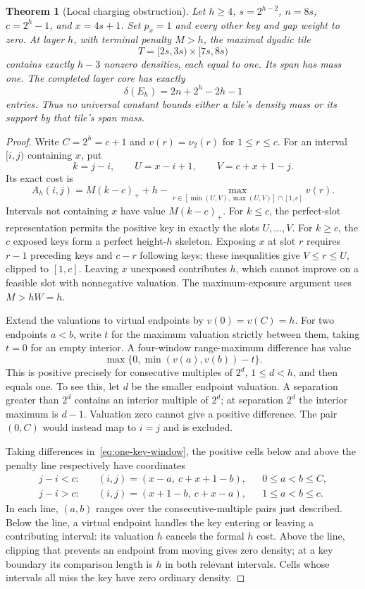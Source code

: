 \documentclass[11pt]{article}
\newtheorem{theorem}{Theorem}
\begin{document}
\begin{theorem}[Local charging obstruction]\label{thm:local-tile-obstruction}
Let $h\ge4$, $s=2^{h-2}$, $n=8s$, $c=2^h-1$, and $x=4s+1$.
Set $p_x=1$ and every other key and gap weight to zero. At layer $h$,
with terminal penalty $M>h$, the maximal dyadic tile
\[
 T=[2s,3s)\times[7s,8s)
\]
contains exactly $h-3$ nonzero densities, each equal to one. Its span
has mass one. The completed layer core has exactly
\[
 \delta(E_h)=2n+2^h-2h-1
\]
entries. Thus no universal constant bounds either a tile's density mass
or its support by that tile's span mass.
\end{theorem}
\begin{proof}
Write $C=2^h=c+1$ and $v(r)=\nu_2(r)$ for $1\le r\le c$.
For an interval $[i,j)$ containing $x$, put
\[
 k=j-i,\qquad U=x-i+1,\qquad V=c+x+1-j.
\]
Its exact cost is
\begin{equation}\label{eq:one-key-window}
 A_h(i,j)=M(k-c)_++h-
 \max_{r\in[\min(U,V),\max(U,V)]\cap[1,c]}v(r).
\end{equation}
Intervals not containing $x$ have value $M(k-c)_+$.
For $k\le c$, the perfect-slot representation permits the positive key
in exactly the slots $U,\ldots,V$. For $k\ge c$, the $c$ exposed keys
form a perfect height-$h$ skeleton. Exposing $x$ at slot $r$ requires
$r-1$ preceding keys and $c-r$ following keys; these inequalities give
$V\le r\le U$, clipped to $[1,c]$. Leaving $x$ unexposed contributes
$h$, which cannot improve on a feasible slot with nonnegative valuation.
The maximum-exposure argument uses $M>hW=h$.

Extend the valuations to virtual endpoints by $v(0)=v(C)=h$.
For two endpoints $a<b$, write $t$ for the maximum valuation strictly
between them, taking $t=0$ for an empty interior. A four-window
range-maximum difference has value
\begin{equation}\label{eq:ruler-endpoint-density}
 \max\{0,\min(v(a),v(b))-t\}.
\end{equation}
This is positive precisely for consecutive multiples of $2^d$,
$1\le d<h$, and then equals one. To see this, let $d$ be the smaller
endpoint valuation. A separation greater than $2^d$ contains an interior
multiple of $2^d$; at separation $2^d$ the interior maximum is $d-1$.
Valuation zero cannot give a positive difference. The pair $(0,C)$
would instead map to $i=j$ and is excluded.

Taking differences in~\eqref{eq:one-key-window}, the positive cells
below and above the penalty line respectively have coordinates
\begin{align*}
 j-i<c:&\quad (i,j)=(x-a,\ c+x+1-b),
                  &&0\le a<b\le C,\\
 j-i>c:&\quad (i,j)=(x+1-b,\ c+x-a),
                  &&1\le a<b\le c.
\end{align*}
In each line, $(a,b)$ ranges over the consecutive-multiple pairs just
described. Below the line, a virtual endpoint handles the key entering
or leaving a contributing interval: its valuation $h$ cancels the
formal $h$ cost. Above the line, clipping that prevents an endpoint
from moving gives zero density; at a key boundary its comparison
length is $h$ in both relevant intervals. Cells whose intervals all
miss the key have zero ordinary density.


\end{proof}
\end{document}
